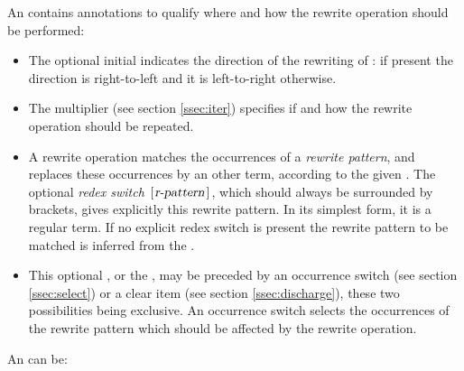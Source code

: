 An  contains annotations to qualify where and how   the
rewrite operation should be performed:
\begin{itemize}
\item The optional initial \ssrC{-} indicates the direction of the rewriting
  of : if present the direction is right-to-left and it is
  left-to-right otherwise.
\item The multiplier  (see section \ref{ssec:iter})
  specifies if and how the rewrite operation should be repeated.
\item A rewrite operation matches the occurrences of a \emph{rewrite
  pattern}, and replaces these occurrences by an other term, according
  to the given .
  The optional \emph{redex switch} $\ssrC{[}\ssrN{r-pattern}\ssrC{]}$, which
  should always be surrounded by brackets, gives explicitly this
  rewrite pattern. In its simplest form, it is a regular term.
  If no explicit redex switch
  is present the rewrite pattern to be matched is inferred from the
  .
\item This optional {\term}, or
  the , may be preceded by an
  occurrence switch (see section \ref{ssec:select}) or a clear item
  (see section \ref{ssec:discharge}), these two possibilities being
  exclusive. An occurrence switch selects the occurrences of the
  rewrite pattern which should be affected by the rewrite operation.
\end{itemize}


An  can be:



